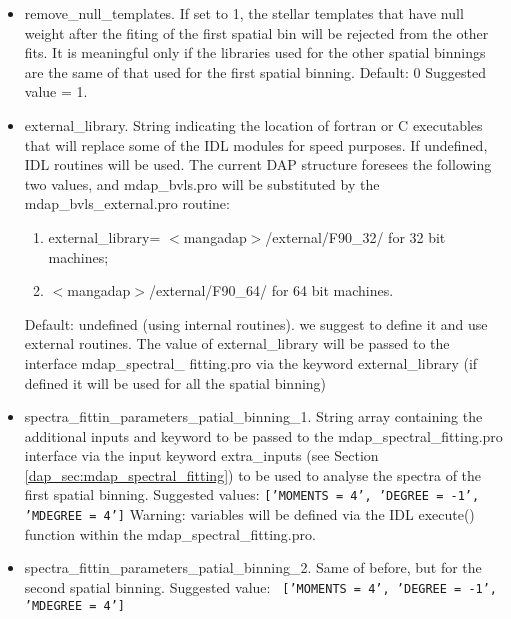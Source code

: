 \begin{itemize}
  \item remove\_null\_templates. If set to 1, the stellar templates
    that have null weight after the fiting of the first spatial bin
    will be rejected from the other fits. It is meaningful only if the
    libraries used for the other spatial binnings are the same of that
    used for the first spatial binning. Default: 0 Suggested value =
    1.

  \item external\_library. String indicating the location of fortran
    or C executables that will replace some of the IDL modules for
    speed purposes. If undefined, IDL routines will be used. The
    current DAP structure foresees the following two values, and
    mdap\_bvls.pro will be substituted by the mdap\_bvls\_external.pro
    routine:

    \begin{enumerate}

      \item external\_library= $<$mangadap$>$/external/F90\_32/ for 32
        bit machines;
 
      \item $<$mangadap$>$/external/F90\_64/ for 64 bit machines.

    \end{enumerate}

   Default: undefined (using internal routines). we suggest to define
   it and use external routines. The value of external\_library will
   be passed to the interface mdap\_spectral\_ fitting.pro via the
   keyword external\_library (if defined it will be used for all the
   spatial binning)

  \item spectra\_fittin\_parameters\_patial\_binning\_1. String array
    containing the additional inputs and keyword to be passed to the
    mdap\_spectral\_fitting.pro interface via the input keyword
    extra\_inputs (see Section \ref{dap_sec:mdap_spectral_fitting}) to
    be used to analyse the spectra of the first spatial binning.
    Suggested values: {\tt ['MOMENTS = 4', 'DEGREE = -1', 'MDEGREE =
        4']} Warning: variables will be defined via the IDL execute()
    function within the mdap\_spectral\_fitting.pro.

  \item spectra\_fittin\_parameters\_patial\_binning\_2. Same of
    before, but for the second spatial binning. Suggested value: {\tt
      ['MOMENTS = 4', 'DEGREE = -1', 'MDEGREE = 4']}


\end{itemize}
